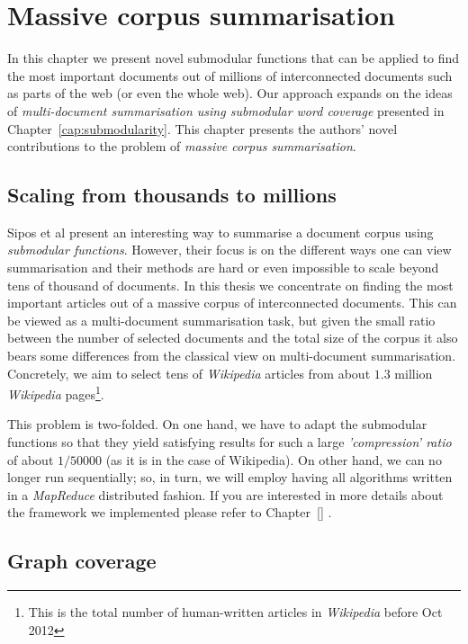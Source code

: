 \chapter{Massive corpus summarisation}

In this chapter we present novel submodular functions that can be applied to
find the most important documents out of millions of interconnected documents
such as parts of the web (or even the whole web).
Our approach expands on the ideas of \emph{multi-document summarisation using
submodular word coverage} \cite{sipos2012temporal} presented in
Chapter~\vref{cap:submodularity}.
This chapter presents the authors' novel contributions to the problem of
\emph{massive corpus summarisation}.

\section{Scaling from thousands to millions}

Sipos et al \cite{sipos2012temporal} present an interesting way to summarise a
document corpus using \emph{submodular functions}. However, their focus is on
the different ways one can view summarisation and their methods are hard or
even impossible to scale beyond tens of thousand of documents.
In this thesis we concentrate on finding the most important articles out of a
massive corpus of interconnected documents. This can be viewed as a
multi-document summarisation task, but given the small ratio between the
number of selected documents and the total size of the corpus it also bears
some differences from the classical view on multi-document summarisation.
Concretely, we aim to select tens of \emph{Wikipedia} articles from about
\(1.3\) million \emph{Wikipedia} pages\footnote{This is the total number of
human-written articles in \emph{Wikipedia} before Oct 2012}.

This problem is two-folded. On one hand, we have to adapt the submodular
functions so that they yield satisfying results for such a large
\emph{'compression' ratio} of about \(1/50000\) (as it is in the case of
Wikipedia). On other hand, we can no longer run sequentially; so, in turn, we
will employ having all algorithms written in a \emph{MapReduce}
\cite{dean2008mapreduce} distributed fashion. If you are interested in more
details about the framework we implemented please refer to Chapter~\vref{}
.

\section{Graph coverage}

